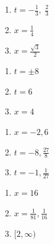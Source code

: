 \documentclass{ximera}
\begin{document}
\begin{multicols}{3}
\begin{enumerate}
\setcounter{enumi}{\value{HW}}


\item  $t = -\frac{1}{3}, \; \frac{2}{3}$  
\item $x = \frac{1}{4}$  
\item $x = \frac{\sqrt{3}}{2}$

\setcounter{HW}{\value{enumi}}
\end{enumerate}
\end{multicols}

\begin{multicols}{3}
\begin{enumerate}
\setcounter{enumi}{\value{HW}}


\item $t = \pm 8$
\item $t = 6$
\item  $x = 4$

\setcounter{HW}{\value{enumi}}
\end{enumerate}
\end{multicols}

\begin{multicols}{3}
\begin{enumerate}
\setcounter{enumi}{\value{HW}}
 
\item  $x=-2, 6$  
\item   $t=-8, \frac{27}{8}$
\item   $t=-1, \frac{1}{27}$   

\setcounter{HW}{\value{enumi}}
\end{enumerate}
\end{multicols}

\begin{multicols}{3}
\begin{enumerate}
\setcounter{enumi}{\value{HW}}

\item $x=16$ 
\item  $x = \frac{1}{81}, \frac{1}{16}$
\item  $[2, \infty)$   


\setcounter{HW}{\value{enumi}}
\end{enumerate}
\end{multicols}
\end{document}
